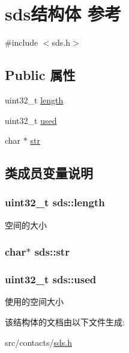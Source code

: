 \hypertarget{structsds}{}\section{sds结构体 参考}
\label{structsds}


{\ttfamily \#include $<$sds.\+h$>$}

\subsection*{Public 属性}
\begin{DoxyCompactItemize}
\item 
uint32\+\_\+t \hyperlink{structsds_a333f14feb33f9719162f37377629716a}{length}
\item 
uint32\+\_\+t \hyperlink{structsds_a5d733da962855ed70322d900c51eb65f}{used}
\item 
char $\ast$ \hyperlink{structsds_aa62fd4653a2d87319c77cc80ef131096}{str}
\end{DoxyCompactItemize}


\subsection{类成员变量说明}
\subsubsection[{\texorpdfstring{length}{length}}]{\setlength{\rightskip}{0pt plus 5cm}uint32\+\_\+t sds\+::length}\hypertarget{structsds_a333f14feb33f9719162f37377629716a}{}\label{structsds_a333f14feb33f9719162f37377629716a}
空间的大小 
\subsubsection[{\texorpdfstring{str}{str}}]{\setlength{\rightskip}{0pt plus 5cm}char$\ast$ sds\+::str}\hypertarget{structsds_aa62fd4653a2d87319c77cc80ef131096}{}\label{structsds_aa62fd4653a2d87319c77cc80ef131096}
\subsubsection[{\texorpdfstring{used}{used}}]{\setlength{\rightskip}{0pt plus 5cm}uint32\+\_\+t sds\+::used}\hypertarget{structsds_a5d733da962855ed70322d900c51eb65f}{}\label{structsds_a5d733da962855ed70322d900c51eb65f}
使用的空间大小 

该结构体的文档由以下文件生成\+:\begin{DoxyCompactItemize}
\item 
src/contacts/\hyperlink{sds_8h}{sds.\+h}\end{DoxyCompactItemize}
